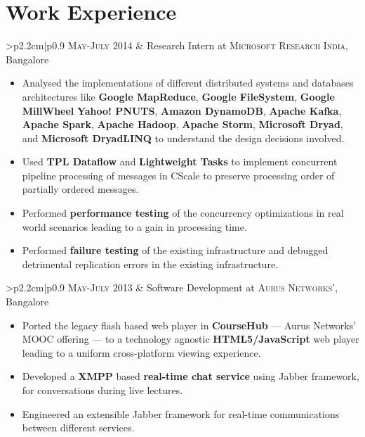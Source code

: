 \documentclass[a4paper,10pt]{article} %
\newcommand{\work}[3]{
    \begin{tabular}{>{\raggedleft}p{2.2cm}|p{0.9\linewidth}}
        \textsc{#1} & \textcolor{NavyBlue}{#2}
                    \footnotesize{#3}
    \end{tabular}
}
\begin{document}

\section{Work Experience}

\work {May-July 2014}
      {Research Intern at \textsc{Microsoft Research India}, Bangalore}
      {
         \begin{itemize}[leftmargin=*]
             \item Analysed the implementations of different distributed systems and databases architectures like
                 \textbf{Google MapReduce}, \textbf{Google FileSystem}, \textbf{Google MillWheel} \textbf{Yahoo! PNUTS},
                 \textbf{Amazon DynamoDB}, \textbf{Apache Kafka}, \textbf{Apache Spark}, \textbf{Apache Hadoop}, \textbf{Apache Storm},
                 \textbf{Microsoft Dryad}, and \textbf{Microsoft DryadLINQ} to understand the design decisions involved.
             \item Used \textbf{TPL Dataflow} and \textbf{Lightweight Tasks} to implement concurrent pipeline processing of messages in
                 CScale to preserve processing order of partially ordered messages.
             \item Performed \textbf{performance testing} of the concurrency optimizations in real world scenarios leading to a gain in processing time.
             \item Performed \textbf{failure testing} of the existing infrastructure and debugged detrimental replication errors in the
                 existing infrastructure.
         \end{itemize}
     }

\work {May-July 2013}
      {Software Development at \textsc{Aurus Networks'}, Bangalore}
      {
          \begin{itemize}[leftmargin=*]
              \item Ported the legacy flash based web player in \textbf{CourseHub} --- Aurus Networks' MOOC offering --- to a technology agnostic
                  \textbf{HTML5/JavaScript} web player leading to a uniform cross-platform viewing experience.
              \item Developed a \textbf{XMPP} based \textbf{real-time chat service} using Jabber framework, for conversations during live lectures.
              \item Engineered an extensible Jabber framework for real-time communications between different services.
          \end{itemize}
      }
\end{document}

